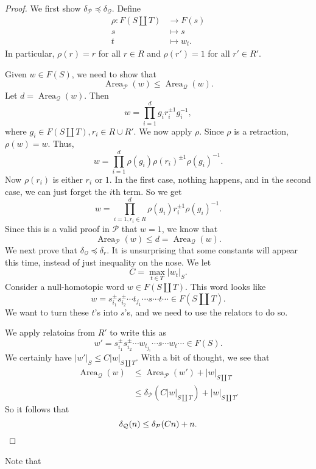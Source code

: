 \documentclass[a4paper]{article}
\DeclareMathOperator\Area{Area}
\begin{document}
\begin{proof}
  We first show $\delta_{\mathcal{P}} \preccurlyeq \delta_{\mathcal{Q}}$. Define
  \begin{align*}
    \rho: F(S \coprod T) & \to F(s)\\
    s &\mapsto s\\
    t &\mapsto w_t.
  \end{align*}
  In particular, $\rho(r) = r$ for all $r \in R$ and $\rho(r') = 1$ for all $r' \in R'$.

  Given $w \in F(S)$, we need to show that
  \[
    \Area_{\mathcal{P}}(w) \leq \Area_{\mathcal{Q}}(w).
  \]
  Let $d = \Area_\mathcal{Q} (w)$. Then
  \[
    w = \prod_{i = 1}^d g_i r_i^{\pm 1} g_i^{-1},
  \]
  where $g_i \in F(S \coprod T), r_i \in R \cup R'$. We now apply $\rho$. Since $\rho$ is a retraction, $\rho(w) = w$. Thus,
  \[
    w = \prod_{i = 1}^d \rho(g_i) \rho(r_i)^{\pm 1} \rho(g_i)^{-1}.
  \]
  Now $\rho(r_i)$ is either $r_i$ or $1$. In the first case, nothing happens, and in the second case, we can just forget the $i$th term. So we get
  \[
    w = \prod_{i = 1, r_i \in R}^d\rho(g_i) r_i^{\pm 1} \rho(g_i)^{-1}.
  \]
  Since this is a valid proof in $\mathcal{P}$ that $w = 1$, we know that
  \[
    \Area_{\mathcal{P}}(w) \leq d = \Area_{\mathcal{Q}}(w).
  \]
  We next prove that $\delta_{\mathcal{Q}} \preccurlyeq \delta_r$. It is unsurprising that some constants will appear this time, instead of just inequality on the nose. We let
  \[
    C = \max_{t \in T} |w_t|_S.
  \]
  Consider a null-homotopic word $w \in F(S \coprod T)$. This word looks like
  \[
    w = s_{i_1}^{\pm} s_{i_2}^{\pm } \cdots t_{j_1} \cdots s \cdots t \cdots \in F(S \coprod T).
  \]
  We want to turn these $t$'s into $s$'s, and we need to use the relators to do so.

  We apply relatoins from $R'$ to write this as
  \[
    w' = s_{i_1}^{\pm} s_{i_2}^{\pm } \cdots w_{t_{j_1}} \cdots s \cdots w_t \cdots \in F(S).
  \]
  We certainly have $|w'|_S \leq C |w|_{S \coprod T}$. With a bit of thought, we see that
  \begin{align*}
    \Area_{\mathcal{Q}}(w) &\leq \Area_{\mathcal{P}}(w') + |w|_{S \coprod T}\\
    &\leq \delta_{\mathcal{P}}(C|w|_{S \coprod T} ) + |w|_{S \coprod T}.
  \end{align*}
  So it follows that
  \[
    \delta_{\mathcal{Q}}(n) \leq \delta_{\mathcal{P}}(Cn) + n.\qedhere
  \]
\end{proof}
Note that
\end{document}
